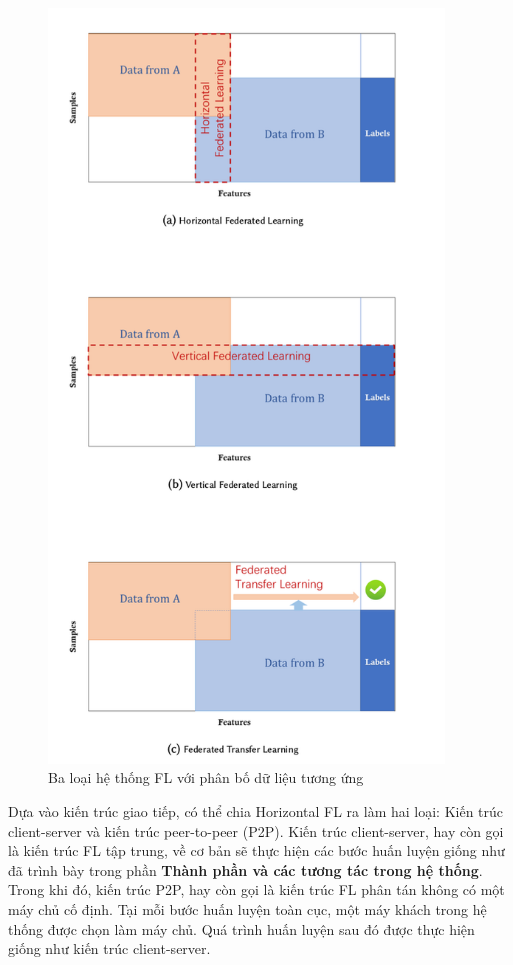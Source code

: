 \begin{figure}
    \begin{center}
        \includegraphics[height=20cm]{images/taxonomy_fl.png}
        \caption{Ba loại hệ thống FL với phân bố dữ liệu tương ứng \cite{yang2019federated}}
        \label{fig:taxonomy_fl}
    \end{center}
\end{figure}

Dựa vào kiến trúc giao tiếp, có thể chia Horizontal FL ra làm hai loại: Kiến trúc client-server và kiến trúc peer-to-peer (P2P). Kiến trúc client-server, hay còn gọi là kiến trúc FL tập trung, về cơ bản sẽ thực hiện các bước huấn luyện giống như đã trình bày trong phần \textbf{Thành phần và các tương tác trong hệ thống}. Trong khi đó, kiến trúc P2P, hay còn gọi là kiến trúc FL phân tán không có một máy chủ cố định. Tại mỗi bước huấn luyện toàn cục, một máy khách trong hệ thống được chọn làm máy chủ. Quá trình huấn luyện sau đó được thực hiện giống như kiến trúc client-server.

